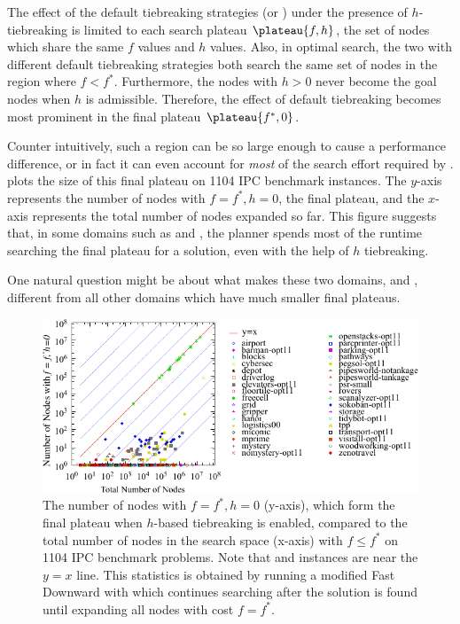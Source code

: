 
The effect of the default tiebreaking strategies (\lifo or
\fifo) under the presence of $h$-tiebreaking is
limited to each search plateau $\plateau{f,h}$, the set of nodes which
share the same $f$ values and $h$ values.
% 
Also, in optimal search, the two \astar with
different default tiebreaking strategies both search the same set of
nodes in the region where $f<f^*$.
% 
Furthermore, the nodes with $h>0$ never become the goal nodes when $h$ is admissible.
% 
Therefore, the effect of default tiebreaking becomes most prominent in the final plateau $\plateau{f^*,0}$.

Counter intuitively, such a region can be so large enough to
cause a performance difference, or in fact it can even account for \emph{most} of the
search effort required by \astar.
 plots the size of this final plateau on 1104 IPC
benchmark instances.  The $y$-axis represents the number of nodes with
$f=f^*, h=0$, the final plateau, and the $x$-axis represents the total
number of nodes expanded so far. This figure suggests that, in some
domains such as  and , the planner
spends most of the runtime searching the final plateau for a solution,
even with the help of $h$ tiebreaking.

One natural question might be about what makes these two domains,
 and , different from all other domains
which have much smaller final plateaus.

\begin{figure}[htbp]
   \centering
  \includegraphics{tables/aaai16-frontier/aaai16prelim3/lmcut_frontier-front.pdf}
  \caption{
 The number of nodes with $f=f^*, h=0$ (y-axis), which form
  the final plateau when $h$-based tiebreaking is enabled, compared to
  the total number of nodes in the search space (x-axis) with $f\leq
  f^*$ on 1104 IPC benchmark problems.  Note that 
  and  instances are near the $y=x$ line.
  This statistics is obtained by running a modified Fast Downward with
 \lmcut which continues searching after the solution is found
 until expanding all nodes with cost $f=f^*$.} \label{fig:plateau}
\end{figure}

